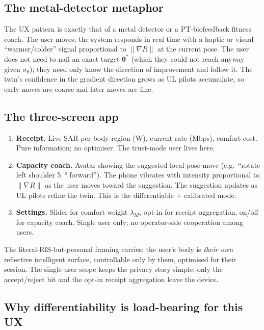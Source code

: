 \documentclass[11pt,a4paper]{article}
\theoremstyle{definition}
\newcommand{\thetab}{\bm{\theta}}
\begin{document}
\subsection{The metal-detector metaphor}

The UX pattern is exactly that of a metal detector or a
PT-biofeedback fitness coach.  The user moves; the system responds
in real time with a haptic or visual ``warmer/colder'' signal
proportional to $\|\nabla R\|$ at the current pose.  The user does
not need to nail an exact target $\thetab^*$ (which they could not
reach anyway given $\sigma_\theta$); they need only know the
direction of improvement and follow it.  The twin's confidence in
the gradient direction grows as UL pilots accumulate, so early
moves are coarse and later moves are fine.

\subsection{The three-screen app}

\begin{enumerate}[leftmargin=1.6em,itemsep=2pt]
\item \textbf{Receipt.}  Live SAR per body region (W), current
rate (Mbps), comfort cost.  Pure information; no optimiser.  The
trust-mode user lives here.
\item \textbf{Capacity coach.}  Avatar showing the suggested local
pose move (e.g.\ ``rotate left shoulder \SI{5}{\degree} forward'').
The phone vibrates with intensity proportional to $\|\nabla R\|$
as the user moves toward the suggestion.  The suggestion updates
as UL pilots refine the twin.  This is the differentiable +
calibrated mode.
\item \textbf{Settings.}  Slider for comfort weight $\lambda_M$,
opt-in for receipt aggregation, on/off for capacity coach.  Single
user only; no operator-side cooperation among users.
\end{enumerate}

The literal-RIS-but-personal framing carries: the user's body is
\emph{their own} reflective intelligent surface, controllable only
by them, optimised for their session.  The single-user scope keeps
the privacy story simple: only the accept/reject bit and the
opt-in receipt aggregation leave the device.

\subsection{Why differentiability is load-bearing for this UX}
\end{document}
